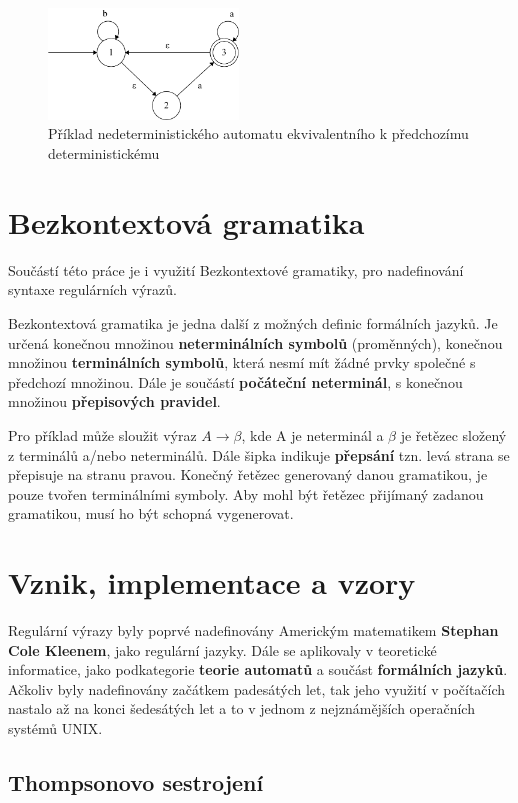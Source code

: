 \begin{figure}[!h]
	\centering
	\includegraphics[width=0.45\textwidth]{Figures/NFA_example.pdf}
	\caption{Příklad nedeterministického automatu ekvivalentního k předchozímu deterministickému}
	\label{fig:NFAex}
\end{figure}

\section{Bezkontextová gramatika}
Součástí této práce je i využití Bezkontextové gramatiky, pro nadefinování syntaxe regulárních výrazů.

Bezkontextová gramatika je jedna další z možných definic formálních jazyků. 
Je určená konečnou množinou \textbf{neterminálních symbolů} (proměnných), konečnou množinou \textbf{terminálních symbolů}, která nesmí mít žádné prvky společné s předchozí množinou.
Dále je součástí \textbf{počáteční neterminál}, s konečnou množinou \textbf{přepisových pravidel}\cite{MUNIFL}.

Pro příklad může sloužit výraz $A \longrightarrow \beta$, kde A je neterminál a $\beta$ je řetězec složený z terminálů a/nebo neterminálů. 
Dále šipka indikuje \textbf{přepsání} tzn. levá strana se přepisuje na stranu pravou.
Konečný řetězec generovaný danou gramatikou, je pouze tvořen terminálními symboly.
Aby mohl být řetězec přijímaný zadanou gramatikou, musí ho být schopná vygenerovat.

\section{Vznik, implementace a vzory}
Regulární výrazy byly poprvé nadefinovány Americkým matematikem \textbf{Stephan Cole Kleenem}, jako regulární jazyky. 
Dále se aplikovaly v teoretické informatice, jako podkategorie \textbf{teorie automatů} a součást \textbf{formálních jazyků}.
Ačkoliv byly nadefinovány začátkem padesátých let, tak jeho využití v počítačích nastalo až na konci šedesátých let a to v jednom z nejznámějších operačních systémů UNIX.

\subsection*{Thompsonovo sestrojení}

